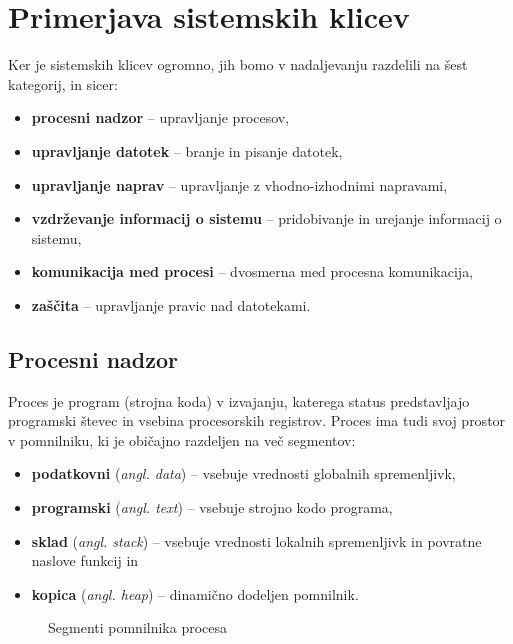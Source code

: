 \documentclass[a4paper,12pt,openright]{book}
\begin{document}
\chapter{Primerjava sistemskih klicev}

Ker je sistemskih klicev ogromno, jih bomo v nadaljevanju razdelili na šest kategorij, in sicer:
\begin{itemize}
	\item \textbf{procesni nadzor} -- upravljanje procesov,
	\item \textbf{upravljanje datotek} -- branje in pisanje datotek,
	\item \textbf{upravljanje naprav} -- upravljanje z vhodno-izhodnimi napravami,
	\item \textbf{vzdrževanje informacij o sistemu} -- pridobivanje in urejanje informacij o sistemu,
	\item \textbf{komunikacija med procesi} -- dvosmerna med procesna komunikacija,
	\item \textbf{zaščita} -- upravljanje pravic nad datotekami. \cite{Silberschatz_Galvin_Gagne_2018}
\end{itemize}

\section{Procesni nadzor}

Proces je program (strojna koda) v izvajanju, katerega status predstavljajo programski števec in vsebina procesorskih registrov.
Proces ima tudi svoj prostor v pomnilniku, ki je običajno razdeljen na več segmentov:
\begin{itemize}
	\item \textbf{podatkovni} (\textit{angl. data}) -- vsebuje vrednosti globalnih spremenljivk,
	\item \textbf{programski} (\textit{angl. text}) -- vsebuje strojno kodo programa,
	\item \textbf{sklad} (\textit{angl. stack}) -- vsebuje vrednosti lokalnih spremenljivk in povratne naslove funkcij in
	\item \textbf{kopica} (\textit{angl. heap}) -- dinamično dodeljen pomnilnik. \cite{Silberschatz_Galvin_Gagne_2018}
\end{itemize}

\begin{figure}[h!]
	\begin{center}
	\end{center}
	\caption{Segmenti pomnilnika procesa}
\end{figure}
\end{document}

